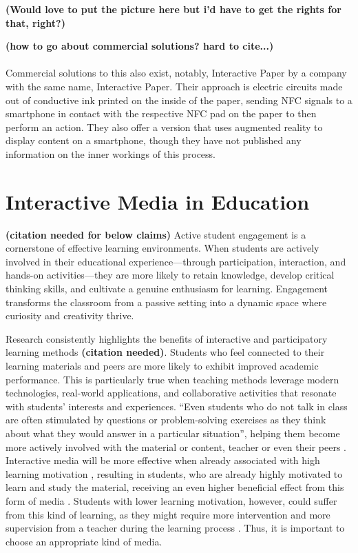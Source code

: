 \textbf{(Would love to put the picture here but i'd have to get the rights for that, right?)}


\textbf{(how to go about commercial solutions? hard to cite...)}\\\\

Commercial solutions to this also exist, notably, Interactive Paper \cite{interactivepaper} by a company with the same name, Interactive Paper. Their approach is electric circuits made out of conductive ink printed on the inside of the paper, sending NFC signals to a smartphone in contact with the respective NFC pad on the paper to then perform an action. They also offer a version that uses augmented reality to display content on a smartphone, though they have not published any information on the inner workings of this process.

\section{Interactive Media in Education}

\textbf{(citation needed for below claims)}
Active student engagement is a cornerstone of effective learning environments. When students are actively involved in their educational experience—through participation, interaction, and hands-on activities—they are more likely to retain knowledge, develop critical thinking skills, and cultivate a genuine enthusiasm for learning. Engagement transforms the classroom from a passive setting into a dynamic space where curiosity and creativity thrive.

Research consistently highlights the benefits of interactive and participatory learning methods \textbf{(citation needed)}. Students who feel connected to their learning materials and peers are more likely to exhibit improved academic performance\cite{Groccia}. This is particularly true when teaching methods leverage modern technologies, real-world applications, and collaborative activities that resonate with students’ interests and experiences\cite{Sahronih}.
\enquote{Even students who do not talk in class are often stimulated by questions or problem-solving exercises as they think about what they would answer in a particular situation}\cite{Steinert}, helping them become more actively involved with the material or content, teacher or even their peers \cite{Steinert}.
Interactive media will be more effective when already associated with high learning motivation \cite{Sahronih2}, resulting in students, who are already highly motivated to learn and study the material, receiving an even higher beneficial effect from this form of media \cite{Sahronih2}. Students with lower learning motivation, however, could suffer from this kind of learning, as they might require more intervention and more supervision from a teacher during the learning process \cite{Sahronih2}. Thus, it is important to choose an appropriate kind of media.